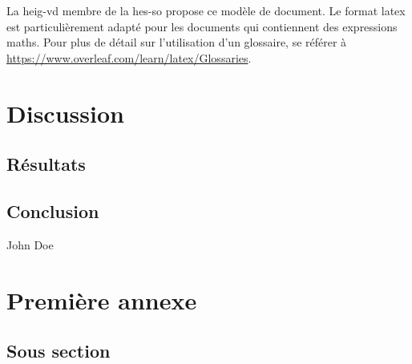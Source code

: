 \documentclass[
    iai, %
    eai  %
]{heig-tb}
\begin{document}
La \Gls{heig-vd} membre de la \Gls{hes-so} propose ce modèle de document. Le format \Gls{latex} est particulièrement adapté pour les documents qui contiennent des expressions \gls{maths}. Pour plus de détail sur l'utilisation d'un glossaire, se référer à \url{https://www.overleaf.com/learn/latex/Glossaries}.

\chapter{Discussion}
\section{Résultats}
\lipsum[10]

\section{Conclusion}
\lipsum[11]

\vfil
\hspace{8cm}John Doe\par
\hspace{8cm}\begin{minipage}{5cm}
\end{minipage}
\clearpage

\appendix
\appendixpage
\addappheadtotoc

\chapter{Première annexe}
\section{Sous section}
\lipsum[1]

\let\cleardoublepage\clearpage
\backmatter

\printglossary
\printbibliography
\label{index}
\printindex
\end{document}
